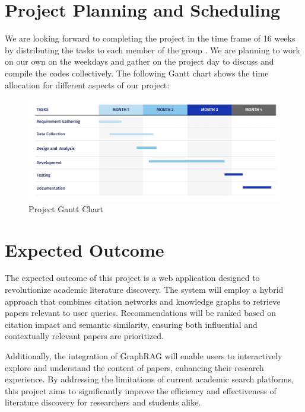 \documentclass[a4paper,12pt]{article}
\begin{document}
\section{Project Planning and Scheduling}
We are looking forward to completing the project in the time frame of 16 weeks by
distributing the tasks to each member of the group . We are planning to work on our own
on the weekdays and gather on the project day to discuss and compile the codes
collectively. The following Gantt chart shows the time allocation for different aspects of
our project:
\begin{figure}[H]
    \centering
    \includegraphics[width=15cm]{ganttchart.png}
    \caption{Project Gantt Chart}
\end{figure}
\newpage

\section{Expected Outcome}
The expected outcome of this project is a web application designed to revolutionize
academic literature discovery. The system will employ a hybrid approach that combines
citation networks and knowledge graphs to retrieve papers relevant to user queries.
Recommendations will be ranked based on citation impact and semantic similarity,
ensuring both influential and contextually relevant papers are prioritized.

Additionally, the integration of GraphRAG will enable users to interactively
explore and understand the content of papers, enhancing their research experience.
By addressing the limitations of current academic search platforms, this project aims
to significantly improve the efficiency and effectiveness of literature discovery
for researchers and students alike.
\newpage

\printbibliography
\newpage
\end{document}
